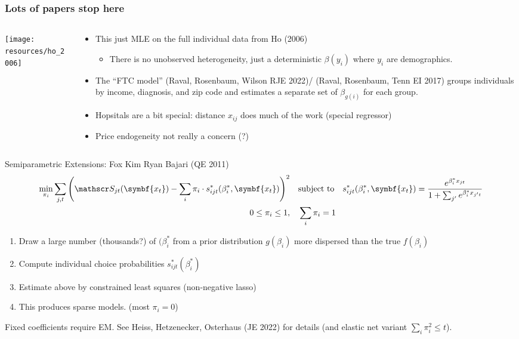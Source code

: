 \documentclass[aspectratio=169,10pt]{beamer}
\begin{document}
\begin{frame}\frametitle{Lots of papers stop here}
\begin{columns}
\begin{column}{0.3\textwidth}
     \texttt{[image: resources/ho\_2006]}      
\end{column}
\begin{column}{0.7\textwidth}
\begin{itemize}
\item This just MLE on the full individual data from Ho (2006)
\begin{itemize}
\item There is no unobserved heterogeneity, just a deterministic $\beta(y_i)$ where $y_i$ are demographics.
\end{itemize}
\item The ``FTC model'' (Raval, Rosenbaum, Wilson RJE 2022)/ (Raval, Rosenbaum, Tenn EI 2017) groups individuals by income, diagnosis, and zip code and estimates a separate set of $\beta_{g(i)}$ for each group.
\item Hopsitals are a bit special: distance $x_{ij}$ does much of the work (special regressor)
\item Price endogeneity not really a concern (?)
\end{itemize}
\end{column}
\end{columns}
\end{frame}

\begin{frame}{Semiparametric Extensions: Fox Kim Ryan Bajari (QE 2011)}
\vspace{-0.5cm}
\begin{align*}
\nonumber \min_{\pi_i} \sum_{j,t} \left(\calS_{jt}(\symbf{x_t}) - \sum_i \pi_i \cdot s^{*}_{ijt}(\beta^{*}_i, \symbf{x_t})\right)^2 &
\quad \text{subject to} \quad s^{*}_{ijt}(\beta^{*}_i, \symbf{x_t}) = \frac{e^{\beta^{*}_i x_{jt} }}{1+\sum_{j'}e^{\beta^{*}_i x_{j't}}}\\
   0\leq  \pi_i \leq 1,& \quad   \sum_i \pi_i = 1
\end{align*}
\vspace{-0.5cm}
\begin{enumerate} 
    \item Draw a large number (thousands?) of $(\beta^{*}_i$ from a prior distribution $g(\beta_i)$ more dispersed than the true $f(\beta_i)$
    \item Compute individual choice probabilities $ s^{*}_{ijt}(\beta^{*}_i)$
    \item Estimate above by constrained least squares (non-negative lasso)
    \item This produces sparse models. (most $\pi_i=0$)
\end{enumerate}
Fixed coefficients require EM. See Heiss, Hetzenecker, Osterhaus (JE 2022) for details (and elastic net variant $\sum_i \pi_i^2 \leq t$).
\end{frame}
\end{document}
